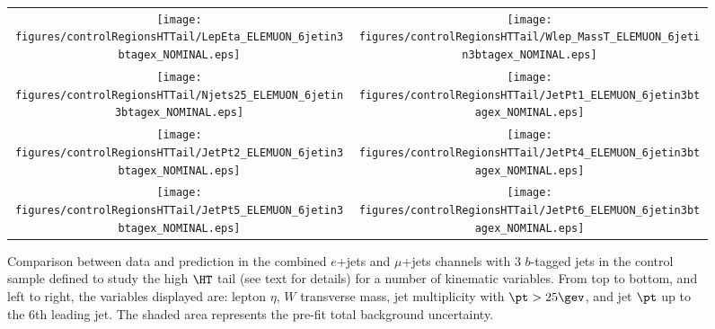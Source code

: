 \begin{figure}[htbp]
\begin{center}
\begin{tabular}{cc}
%
\texttt{[image: figures/controlRegionsHTTail/LepEta\_ELEMUON\_6jetin3btagex\_NOMINAL.eps]} &
\texttt{[image: figures/controlRegionsHTTail/Wlep\_MassT\_ELEMUON\_6jetin3btagex\_NOMINAL.eps]} \\
\texttt{[image: figures/controlRegionsHTTail/Njets25\_ELEMUON\_6jetin3btagex\_NOMINAL.eps]} &
\texttt{[image: figures/controlRegionsHTTail/JetPt1\_ELEMUON\_6jetin3btagex\_NOMINAL.eps]} \\
\texttt{[image: figures/controlRegionsHTTail/JetPt2\_ELEMUON\_6jetin3btagex\_NOMINAL.eps]} &
\texttt{[image: figures/controlRegionsHTTail/JetPt4\_ELEMUON\_6jetin3btagex\_NOMINAL.eps]} \\
\texttt{[image: figures/controlRegionsHTTail/JetPt5\_ELEMUON\_6jetin3btagex\_NOMINAL.eps]} &
\texttt{[image: figures/controlRegionsHTTail/JetPt6\_ELEMUON\_6jetin3btagex\_NOMINAL.eps]} \\
\end{tabular}\caption{\small {Comparison between data and prediction in the combined $e$+jets and $\mu$+jets channels with 3 $b$-tagged jets in the control sample
defined to study the high $\HT$ tail (see text for details)  for a number of kinematic
variables. From top to bottom, and left to right, the variables displayed are: lepton $\eta$, $W$ transverse mass, jet multiplicity with $\pt>25\gev$, 
and jet $\pt$ up to the 6th leading jet.
The shaded area represents the pre-fit total background uncertainty.}}
\label{fig:ELEMUON_controlHTTail_3btagex_2}
\end{center}
\end{figure}
